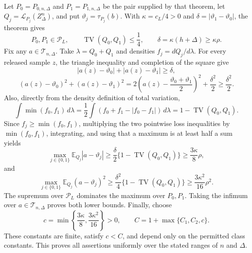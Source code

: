 Let \(P_0=P_{0,n,\Delta}\) and \(P_1=P_{1,n,\Delta}\) be the pair supplied by that theorem, let \(Q_j=\mathcal L_{P_j}(Z_\Delta^n)\), and put \(\vartheta_j=\tau_{P_j}(b)\).  With \(\kappa=c_L/4>0\) and \(\delta=|\vartheta_1-\vartheta_0|\), the theorem gives
\[
 P_0,P_1\in\mathcal P_L,
 \qquad
 \operatorname{TV}(Q_0,Q_1)\leq\frac14,
 \qquad
 \delta=\kappa(h+\Delta)\geq\kappa\rho.
\]
Fix any \(a\in\mathcal T_{n,\Delta}\).  Take \(\lambda=Q_0+Q_1\) and densities \(f_j=dQ_j/d\lambda\).  For every released sample \(z\), the triangle inequality and completion of the square give
\[
 |a(z)-\vartheta_0|+|a(z)-\vartheta_1|\geq\delta,
\]
\[
 (a(z)-\vartheta_0)^2+(a(z)-\vartheta_1)^2
 =2\left(a(z)-\frac{\vartheta_0+\vartheta_1}{2}\right)^2+\frac{\delta^2}{2}
 \geq\frac{\delta^2}{2}.
\]
Also, directly from the density definition of total variation,
\[
 \int\min(f_0,f_1)\,d\lambda
 =\frac12\int(f_0+f_1-|f_0-f_1|)\,d\lambda
 =1-\operatorname{TV}(Q_0,Q_1).
\]
Since \(f_j\geq\min(f_0,f_1)\), multiplying the two pointwise loss inequalities by \(\min(f_0,f_1)\), integrating, and using that a maximum is at least half a sum yields
\[
 \max_{j\in\{0,1\}}\mathbb E_{Q_j}|a-\vartheta_j|
 \geq\frac\delta2\{1-\operatorname{TV}(Q_0,Q_1)\}
 \geq\frac{3\kappa}{8}\rho,
\]
and
\[
 \max_{j\in\{0,1\}}\mathbb E_{Q_j}(a-\vartheta_j)^2
 \geq\frac{\delta^2}{4}\{1-\operatorname{TV}(Q_0,Q_1)\}
 \geq\frac{3\kappa^2}{16}\rho^2.
\]
The supremum over \(\mathcal P_L\) dominates the maximum over \(P_0,P_1\).  Taking the infimum over \(a\in\mathcal T_{n,\Delta}\) proves both lower bounds.  Finally, choose
\[
 c=\min\left\{\frac{3\kappa}{8},\frac{3\kappa^2}{16}\right\}>0,
 \qquad
 C=1+\max\{C_1,C_2,c\}.
\]
These constants are finite, satisfy \(c<C\), and depend only on the permitted class constants.  This proves all assertions uniformly over the stated ranges of \(n\) and \(\Delta\).